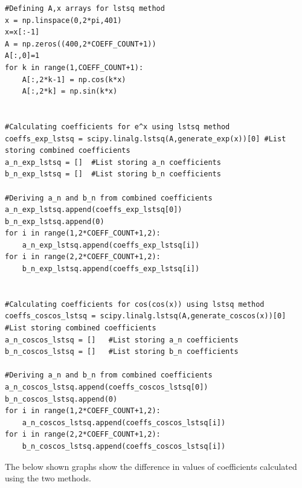 \documentclass[11pt, a4paper]{article}
\begin{document}
\begin{lstlisting}
#Defining A,x arrays for lstsq method
x = np.linspace(0,2*pi,401)
x=x[:-1]  
A = np.zeros((400,2*COEFF_COUNT+1)) 
A[:,0]=1 
for k in range(1,COEFF_COUNT+1):
    A[:,2*k-1] = np.cos(k*x) 
    A[:,2*k] = np.sin(k*x) 

 
#Calculating coefficients for e^x using lstsq method
coeffs_exp_lstsq = scipy.linalg.lstsq(A,generate_exp(x))[0] #List storing combined coefficients
a_n_exp_lstsq = []  #List storing a_n coefficients
b_n_exp_lstsq = []  #List storing b_n coefficients

#Deriving a_n and b_n from combined coefficients
a_n_exp_lstsq.append(coeffs_exp_lstsq[0])
b_n_exp_lstsq.append(0)
for i in range(1,2*COEFF_COUNT+1,2):
    a_n_exp_lstsq.append(coeffs_exp_lstsq[i])
for i in range(2,2*COEFF_COUNT+1,2):
    b_n_exp_lstsq.append(coeffs_exp_lstsq[i])


#Calculating coefficients for cos(cos(x)) using lstsq method
coeffs_coscos_lstsq = scipy.linalg.lstsq(A,generate_coscos(x))[0] #List storing combined coefficients
a_n_coscos_lstsq = []   #List storing a_n coefficients
b_n_coscos_lstsq = []   #List storing b_n coefficients

#Deriving a_n and b_n from combined coefficients
a_n_coscos_lstsq.append(coeffs_coscos_lstsq[0])
b_n_coscos_lstsq.append(0)
for i in range(1,2*COEFF_COUNT+1,2):
    a_n_coscos_lstsq.append(coeffs_coscos_lstsq[i])
for i in range(2,2*COEFF_COUNT+1,2):
    b_n_coscos_lstsq.append(coeffs_coscos_lstsq[i])
\end{lstlisting}
\par The below shown graphs show the difference in values of coefficients calculated using the two methods.
\end{document}
